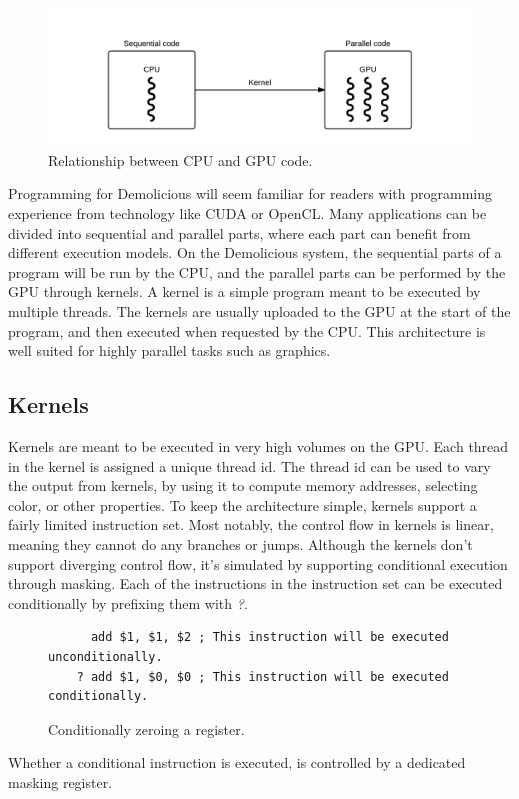 \begin{figure}[H]
	\centering
	\includegraphics[width=\textwidth]{system_overview/diagrams/programming_model_cpu_gpu.png}
	\caption{Relationship between CPU and GPU code.}
	\label{fig:programming_model_cpu_gpu}
\end{figure}
Programming for Demolicious will seem familiar for readers with programming experience from technology like CUDA or OpenCL. 
Many applications can be divided into sequential and parallel parts, where each part can benefit from different execution models. 
On the Demolicious system, the sequential parts of a program will be run by the CPU, and the parallel parts can be performed by the GPU through kernels.
A kernel is a simple program meant to be executed by multiple threads.
The kernels are usually uploaded to the GPU at the start of the program, and then executed when requested by the CPU.
This architecture is well suited for highly parallel tasks such as graphics.

\subsection{Kernels}
Kernels are meant to be executed in very high volumes on the GPU.
Each thread in the kernel is assigned a unique thread id.
The thread id can be used to vary the output from kernels, 
by using it to compute memory addresses, selecting color, or other properties.
To keep the architecture simple, kernels support a fairly limited instruction set.
Most notably, the control flow in kernels is linear, meaning they cannot do any branches or jumps.
Although the kernels don't support diverging control flow,
it's simulated by supporting conditional execution through masking.
Each of the instructions in the instruction set can be executed conditionally by prefixing them with \textit{?}.
\begin{figure}[H]
	\centering
	\begin{verbatim}
	  add $1, $1, $2 ; This instruction will be executed unconditionally.
	? add $1, $0, $0 ; This instruction will be executed conditionally.
	\end{verbatim}
	\caption{Conditionally zeroing a register.}
	\label{fig:conditional_execution}
\end{figure}
Whether a conditional instruction is executed, is controlled by a dedicated masking register. 


